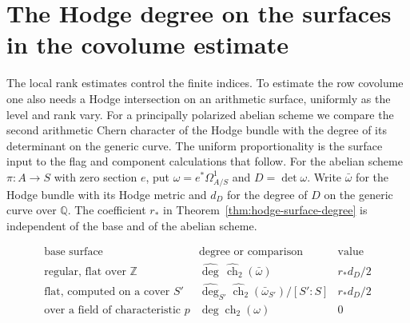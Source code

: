 \section{The Hodge degree on the surfaces in the covolume estimate}
\label{sec:hodge-surface-degree}

The local rank estimates control the finite indices. To estimate the row covolume one also needs a Hodge intersection on an arithmetic surface, uniformly as the level and rank vary. For a principally polarized
abelian scheme we compare the second arithmetic Chern
character of the Hodge bundle with the degree of its
determinant on the generic curve. The uniform proportionality
is the surface input to the flag and component calculations
that follow. For the abelian scheme \(\pi:A\to S\) with zero section \(e\), put \(\omega=e^*\Omega^1_{A/S}\) and \(D=\det\omega\). Write \(\bar\omega\) for the Hodge bundle with its Hodge metric and \(d_D\) for the degree of \(D\) on the generic curve over \(\mathbb Q\). The coefficient \(r_*\) in Theorem~\ref{thm:hodge-surface-degree} is independent of the base and of the abelian scheme.

\begin{construction}
\[
\begin{array}{lll}
\text{base surface}&\text{degree or comparison}&\text{value}\\ \hline
\text{regular, flat over }\mathbb Z&
 \widehat{\deg}\,\widehat{\operatorname{ch}}_2(\bar\omega)&r_*d_D/2\\
\text{flat, computed on a cover }S'&
 \widehat{\deg}_{S'}\widehat{\operatorname{ch}}_2(\bar\omega_{S'})/[S':S]&r_*d_D/2\\
\text{over a field of characteristic }p&
 \deg\operatorname{ch}_2(\omega)&0
\end{array}
\]
\caption{The base and the degree used in the second Hodge intersection. The metric and arithmetic degree occur on the horizontal branch.}\label{fig:hodge-second-surfaces}
\end{construction}

